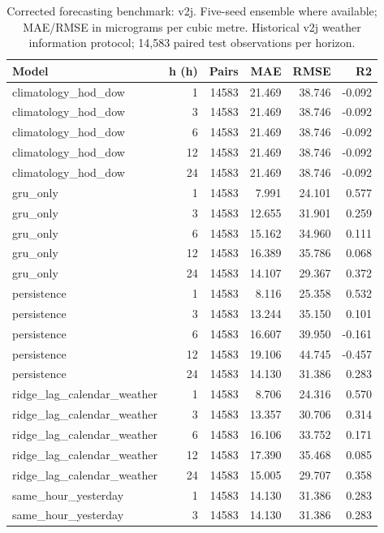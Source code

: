 \begin{table}[t]
\centering
\footnotesize
\caption{Corrected forecasting benchmark: v2j. Five-seed ensemble where available; MAE/RMSE in micrograms per cubic metre. Historical v2j weather information protocol; 14,583 paired test observations per horizon.}
\label{tab:t02a}
\begin{tabular}{lrrrrr}
\hline
Model & h (h) & Pairs & MAE & RMSE & R2 \\
\hline
climatology\_hod\_dow & 1 & 14583 & 21.469 & 38.746 & -0.092 \\
climatology\_hod\_dow & 3 & 14583 & 21.469 & 38.746 & -0.092 \\
climatology\_hod\_dow & 6 & 14583 & 21.469 & 38.746 & -0.092 \\
climatology\_hod\_dow & 12 & 14583 & 21.469 & 38.746 & -0.092 \\
climatology\_hod\_dow & 24 & 14583 & 21.469 & 38.746 & -0.092 \\
gru\_only & 1 & 14583 & 7.991 & 24.101 & 0.577 \\
gru\_only & 3 & 14583 & 12.655 & 31.901 & 0.259 \\
gru\_only & 6 & 14583 & 15.162 & 34.960 & 0.111 \\
gru\_only & 12 & 14583 & 16.389 & 35.786 & 0.068 \\
gru\_only & 24 & 14583 & 14.107 & 29.367 & 0.372 \\
persistence & 1 & 14583 & 8.116 & 25.358 & 0.532 \\
persistence & 3 & 14583 & 13.244 & 35.150 & 0.101 \\
persistence & 6 & 14583 & 16.607 & 39.950 & -0.161 \\
persistence & 12 & 14583 & 19.106 & 44.745 & -0.457 \\
persistence & 24 & 14583 & 14.130 & 31.386 & 0.283 \\
ridge\_lag\_calendar\_weather & 1 & 14583 & 8.706 & 24.316 & 0.570 \\
ridge\_lag\_calendar\_weather & 3 & 14583 & 13.357 & 30.706 & 0.314 \\
ridge\_lag\_calendar\_weather & 6 & 14583 & 16.106 & 33.752 & 0.171 \\
ridge\_lag\_calendar\_weather & 12 & 14583 & 17.390 & 35.468 & 0.085 \\
ridge\_lag\_calendar\_weather & 24 & 14583 & 15.005 & 29.707 & 0.358 \\
same\_hour\_yesterday & 1 & 14583 & 14.130 & 31.386 & 0.283 \\
same\_hour\_yesterday & 3 & 14583 & 14.130 & 31.386 & 0.283 \\

\end{tabular}
\end{table}

